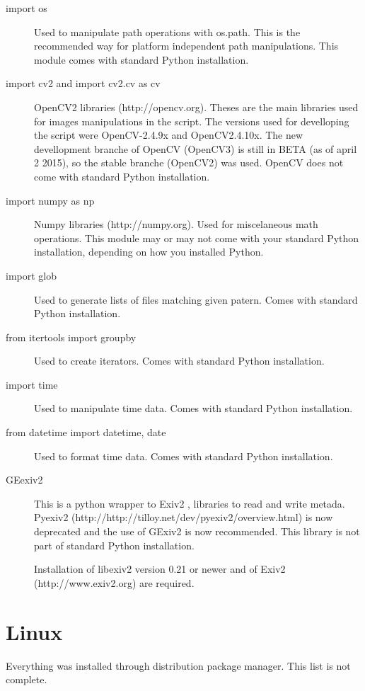 \documentclass[a4paper, 11pt]{article}
\begin{document}
\begin{description}
\item [import os]
Used to manipulate path operations with os.path. This is the recommended way for platform independent path manipulations. This module comes with standard Python installation.

\item [import cv2 and import cv2.cv as cv]

OpenCV2 libraries (http://opencv.org). Theses are the main libraries used for images manipulations in the script. The versions used for develloping the script were OpenCV-2.4.9x and OpenCV2.4.10x. The new devellopment branche of OpenCV (OpenCV3) is still in BETA (as of april 2 2015), so the stable branche (OpenCV2) was used. OpenCV does not come with standard Python installation.

\item [import numpy as np] Numpy libraries (http://numpy.org). Used for miscelaneous math operations. This module may or may not come with your standard Python installation, depending on how you installed Python.

\item[import glob] Used to generate lists of files matching given patern. Comes with standard Python installation.

\item [from itertools import groupby] Used to create iterators. Comes with standard Python installation.

\item [import time] Used to manipulate time data. Comes with standard Python installation.

\item [from datetime import datetime, date] Used to format time data. Comes with standard Python installation.

\item [GEexiv2] This is a python wrapper to Exiv2 , libraries to read and write metada. Pyexiv2 (http://http://tilloy.net/dev/pyexiv2/overview.html) is now deprecated and the use of GExiv2 is now recommended. This library is not part of standard Python installation. 

Installation of libexiv2 version 0.21 or newer and of Exiv2 (http://www.exiv2.org) are required.

\end{description}

\section{Linux}
Everything was installed through distribution package manager. This list is not complete.
\end{document}
